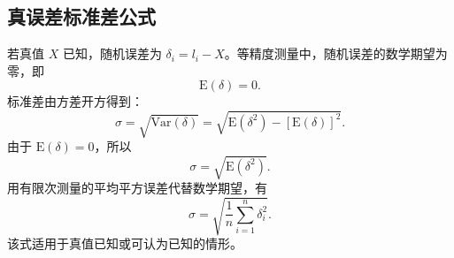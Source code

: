 \documentclass[UTF8,12pt,a4paper]{ctexart}
\newcommand{\E}{\mathrm{E}}
\newcommand{\Var}{\mathrm{Var}}
\begin{document}
\subsection{真误差标准差公式}
若真值 $X$ 已知，随机误差为 $\delta_i=l_i-X$。等精度测量中，随机误差的数学期望为零，即
\begin{equation*}
    \E(\delta)=0 .
\end{equation*}
标准差由方差开方得到：
\begin{equation*}
    \sigma=\sqrt{\Var(\delta)}=\sqrt{\E(\delta^2)-[\E(\delta)]^2}.
\end{equation*}
由于 $\E(\delta)=0$，所以
\begin{equation*}
    \sigma=\sqrt{\E(\delta^2)} .
\end{equation*}
用有限次测量的平均平方误差代替数学期望，有
\begin{equation*}
    \sigma=\sqrt{\frac{1}{n}\sum_{i=1}^{n}\delta_i^2} .
\end{equation*}
该式适用于真值已知或可认为已知的情形。

\newpage
\end{document}
